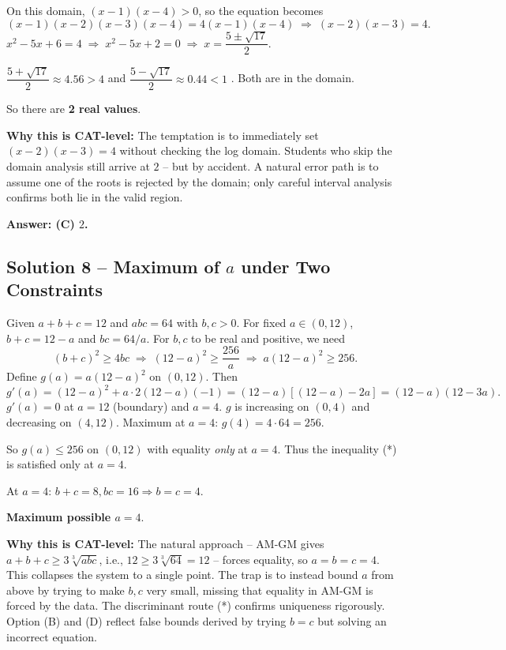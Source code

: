 \documentclass[11pt,a4paper]{article}
\begin{document}
On this domain, $(x-1)(x-4)>0$, so the equation becomes
\[
(x-1)(x-2)(x-3)(x-4) = 4(x-1)(x-4) \;\Longrightarrow\; (x-2)(x-3) = 4.
\]
$x^{2}-5x+6=4 \;\Longrightarrow\; x^{2}-5x+2=0 \;\Longrightarrow\; x = \dfrac{5\pm\sqrt{17}}{2}.$

$\dfrac{5+\sqrt{17}}{2}\approx 4.56 > 4$ \checkmark and $\dfrac{5-\sqrt{17}}{2}\approx 0.44 < 1$ \checkmark. Both are in the domain.

So there are \textbf{2 real values}.

\textbf{Why this is CAT-level:} The temptation is to immediately set $(x-2)(x-3)=4$ without checking the log domain. Students who skip the domain analysis still arrive at $2$ -- but by accident. A natural error path is to assume one of the roots is rejected by the domain; only careful interval analysis confirms both lie in the valid region.

\textbf{Answer: (C) $2$.}

\medskip

\subsection*{Solution 8 -- Maximum of $a$ under Two Constraints}
Given $a+b+c=12$ and $abc=64$ with $b,c>0$. For fixed $a\in(0,12)$, $b+c = 12-a$ and $bc = 64/a$. For $b,c$ to be real and positive, we need
\[
(b+c)^{2}\ge 4bc \;\Longrightarrow\; (12-a)^{2}\ge \frac{256}{a} \;\Longrightarrow\; a(12-a)^{2}\ge 256. \tag{*}
\]
Define $g(a)=a(12-a)^{2}$ on $(0,12)$. Then
\[
g'(a)=(12-a)^{2}+a\cdot 2(12-a)(-1)=(12-a)[(12-a)-2a]=(12-a)(12-3a).
\]
$g'(a)=0$ at $a=12$ (boundary) and $a=4$. $g$ is increasing on $(0,4)$ and decreasing on $(4,12)$. Maximum at $a=4$: $g(4)=4\cdot 64 = 256$.

So $g(a)\le 256$ on $(0,12)$ with equality \emph{only} at $a=4$. Thus the inequality (*) is satisfied only at $a=4$.

At $a=4$: $b+c=8, bc=16 \Rightarrow b=c=4.$

\textbf{Maximum possible $a = 4.$}

\textbf{Why this is CAT-level:} The natural approach -- AM-GM gives $a+b+c\ge 3\sqrt[3]{abc}$, i.e., $12\ge 3\sqrt[3]{64}=12$ -- forces equality, so $a=b=c=4$. This collapses the system to a single point. The trap is to instead bound $a$ from above by trying to make $b,c$ very small, missing that equality in AM-GM is forced by the data. The discriminant route (*) confirms uniqueness rigorously. Option (B) and (D) reflect false bounds derived by trying $b=c$ but solving an incorrect equation.
\end{document}

